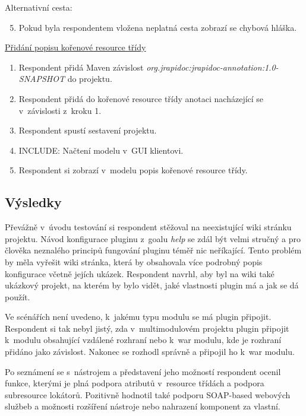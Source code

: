 \documentclass[11pt,twoside,a4paper]{book}
\begin{document}
Alternativní cesta:
\begin{enumerate}
  \setcounter{enumi}{4}
  \item Pokud byla respondentem vložena neplatná cesta zobrazí se chybová hláška.
\end{enumerate}

\underline{Přidání popisu kořenové resource třídy}

\begin{enumerate}
  \item Respondent přidá Maven závislost
  {\em org.jrapidoc:jrapidoc-annotation:1.0-SNAPSHOT} do projektu.
  \item Respondent přidá do kořenové resource třídy anotaci nacházející se v~závislosti
z~kroku 1.

  \item Respondent spustí sestavení projektu.
  \item INCLUDE: Načtení modelu v~GUI klientovi.

  \item Respondent si zobrazí v~modelu popis kořenové resource třídy.
\end{enumerate}

\subsection{Výsledky}

Převážně v~úvodu testování si respondent stěžoval na neexistující wiki stránku
projektu.
Návod konfigurace pluginu z~goalu {\em help} se zdál být velmi stručný a pro
člověka neznalého principů fungování pluginu téměř nic neříkající. Tento problém
by měla vyřešit wiki stránka, která by obsahovala více podrobný popis konfigurace včetně
jejích ukázek. Respondent navrhl, aby byl na wiki také ukázkový projekt, na
kterém by bylo vidět, jaké vlastnosti plugin má a jak se dá použít.

Ve scénářích není uvedeno, k~jakému typu modulu se má plugin připojit.
Respondent si tak nebyl jistý, zda v~multimodulovém projektu plugin připojit
k~modulu obsahující vzdálené rozhraní nebo k~war modulu, kde je rozhraní přidáno
jako závislost. Nakonec se rozhodl správně a připojil ho k~war modulu.

Po seznámení se s~nástrojem a představení jeho možností respondent ocenil
funkce, kterými je plná podpora atributů v~resource třídách a podpora
subresource lokátorů. Pozitivně hodnotil také podporu SOAP-based webových
službeb a možnosti rozšíření nástroje nebo nahrazení komponent za vlastní.
\end{document}
